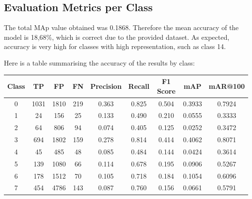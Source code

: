 \documentclass[12pt,oneside]{book} %
\begin{document}
\subsection{Evaluation Metrics per Class}

The total MAp value obtained was 0.1868. Therefore the mean accuracy of the
model is 18,68\%, which is correct due to the provided dataset. As expected,
accuracy is very high for classes with high representation, such as class 14.

Here is a table summarising the accuracy of the results by class:

\begin{table}[H]
    \centering
    \begin{tabular}{|c|c|c|c|c|c|c|c|c|}
        \hline
        \textbf{Class} & \textbf{TP} & \textbf{FP} & \textbf{FN} & \textbf{Precision} & \textbf{Recall} & \textbf{F1 Score} & \textbf{mAP} & \textbf{mAR@100} \\ \hline
        0              & 1031        & 1810        & 219         & 0.363              & 0.825           & 0.504             & 0.3933       & 0.7924           \\ \hline
        1              & 24          & 156         & 25          & 0.133              & 0.490           & 0.210             & 0.0555       & 0.3333           \\ \hline
        2              & 64          & 806         & 94          & 0.074              & 0.405           & 0.125             & 0.0252       & 0.3472           \\ \hline
        3              & 694         & 1802        & 159         & 0.278              & 0.814           & 0.414             & 0.4062       & 0.8071           \\ \hline
        4              & 45          & 485         & 48          & 0.085              & 0.484           & 0.144             & 0.0424       & 0.3614           \\ \hline
        5              & 139         & 1080        & 66          & 0.114              & 0.678           & 0.195             & 0.0906       & 0.5267           \\ \hline
        6              & 178         & 1512        & 70          & 0.105              & 0.718           & 0.184             & 0.1054       & 0.6096           \\ \hline
        7              & 454         & 4786        & 143         & 0.087              & 0.760           & 0.156             & 0.0661       & 0.5791           \\ \hline

\end{tabular}
\end{table}
\end{document}
